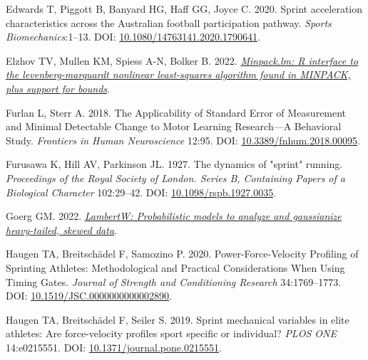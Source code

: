 \documentclass[fleqn,10pt,lineno]{wlpeerj} %
\newlength{\cslhangindent}
\newlength{\cslentryspacingunit} %
\newenvironment{CSLReferences}[2] %
 {%
  \setlength{\parindent}{0pt}
  \ifodd #1
  \let\oldpar\par
  \def\par{\hangindent=\cslhangindent\oldpar}
  \fi
  \setlength{\parskip}{#2\cslentryspacingunit}
 }%
 {}
\begin{document}
\begin{CSLReferences}{1}{0}
\leavevmode{}%
Edwards T, Piggott B, Banyard HG, Haff GG, Joyce C. 2020. Sprint acceleration characteristics across the {Australian} football participation pathway. \emph{Sports Biomechanics}:1--13. DOI: \href{https://doi.org/10.1080/14763141.2020.1790641}{10.1080/14763141.2020.1790641}.

\leavevmode{}%
Elzhov TV, Mullen KM, Spiess A-N, Bolker B. 2022. \emph{\href{https://CRAN.R-project.org/package=minpack.lm}{Minpack.lm: R interface to the levenberg-marquardt nonlinear least-squares algorithm found in MINPACK, plus support for bounds}}.

\leavevmode{}%
Furlan L, Sterr A. 2018. The {Applicability} of {Standard Error} of {Measurement} and {Minimal Detectable Change} to {Motor Learning Research}---{A Behavioral Study}. \emph{Frontiers in Human Neuroscience} 12:95. DOI: \href{https://doi.org/10.3389/fnhum.2018.00095}{10.3389/fnhum.2018.00095}.

\leavevmode{}%
Furusawa K, Hill AV, Parkinson JL. 1927. The dynamics of "sprint" running. \emph{Proceedings of the Royal Society of London. Series B, Containing Papers of a Biological Character} 102:29--42. DOI: \href{https://doi.org/10.1098/rspb.1927.0035}{10.1098/rspb.1927.0035}.

\leavevmode{}%
Goerg GM. 2022. \emph{\href{https://CRAN.R-project.org/package=LambertW}{LambertW: Probabilistic models to analyze and gaussianize heavy-tailed, skewed data}}.

\leavevmode{}%
Haugen TA, Breitschädel F, Samozino P. 2020. Power-{Force}-{Velocity Profiling} of {Sprinting Athletes}: {Methodological} and {Practical Considerations When Using Timing Gates}. \emph{Journal of Strength and Conditioning Research} 34:1769--1773. DOI: \href{https://doi.org/10.1519/JSC.0000000000002890}{10.1519/JSC.0000000000002890}.

\leavevmode{}%
Haugen TA, Breitschädel F, Seiler S. 2019. Sprint mechanical variables in elite athletes: {Are} force-velocity profiles sport specific or individual? \emph{PLOS ONE} 14:e0215551. DOI: \href{https://doi.org/10.1371/journal.pone.0215551}{10.1371/journal.pone.0215551}.


\end{CSLReferences}
\end{document}
